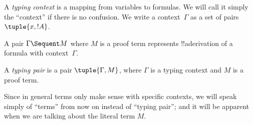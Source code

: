\documentclass[../../../include/open-logic-section]{subfiles}
\begin{document}
\begin{defn}
  A \emph{typing context} is a mapping from variables to formulas. We
  will call it simply the ``context'' if there is no confusion.  We
  write a context~$\Gamma$ as a set of pairs $\tuple{x, !A}$.
\end{defn}

A pair $\Gamma \Sequent M$ where $M$ is a proof term represents
!!a{derivation} of a formula with context~$\Gamma$.

\begin{defn}
  A \emph{typing pair} is a pair $\tuple{\Gamma, M}$,
  where $\Gamma$ is a typing context and $M$ is a proof term. 
\end{defn}

Since in general terms only make sense with specific contexts, we will
speak simply of ``terms'' from now on instead of ``typing pair''; and
it will be apparent when we are talking about the literal term $M$.
\end{document}
